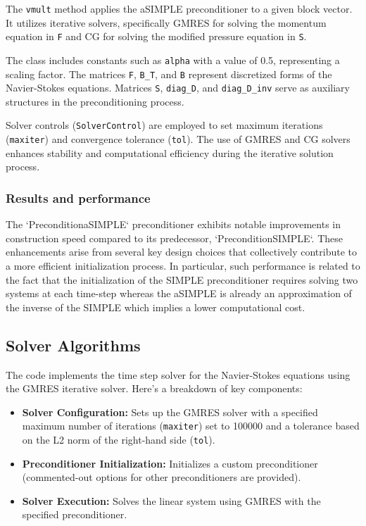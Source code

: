 \documentclass{article}
\begin{document}
The \texttt{vmult} method applies the aSIMPLE preconditioner to a given block vector. It utilizes iterative solvers, specifically GMRES for solving the momentum equation in \texttt{F} and CG for solving the modified pressure equation in \texttt{S}.

The class includes constants such as \texttt{alpha} with a value of 0.5, representing a scaling factor. The matrices \texttt{F}, \texttt{B\_T}, and \texttt{B} represent discretized forms of the Navier-Stokes equations. Matrices \texttt{S}, \texttt{diag\_D}, and \texttt{diag\_D\_inv} serve as auxiliary structures in the preconditioning process.

Solver controls (\texttt{SolverControl}) are employed to set maximum iterations (\texttt{maxiter}) and convergence tolerance (\texttt{tol}). The use of GMRES and CG solvers enhances stability and computational efficiency during the iterative solution process.


\subsubsection{Results and performance}

The `PreconditionaSIMPLE` preconditioner exhibits notable improvements in construction speed compared to its predecessor, `PreconditionSIMPLE`. These enhancements arise from several key design choices that collectively contribute to a more efficient initialization process. In particular, such performance is related to the fact that the initialization of the SIMPLE preconditioner requires solving two systems at each time-step whereas the aSIMPLE is already an approximation of the inverse of the SIMPLE which implies a lower computational cost.


\subsection{Solver Algorithms}

The code implements the time step solver for the Navier-Stokes equations using the GMRES iterative solver. Here's a breakdown of key components:

\begin{itemize}
  \item \textbf{Solver Configuration:} Sets up the GMRES solver with a specified maximum number of iterations (\texttt{maxiter}) set to 100000 and a tolerance based on the L2 norm of the right-hand side (\texttt{tol}).
  \item \textbf{Preconditioner Initialization:} Initializes a custom preconditioner (commented-out options for other preconditioners are provided).
  \item \textbf{Solver Execution:} Solves the linear system using GMRES with the specified preconditioner.
\end{itemize}
\end{document}
